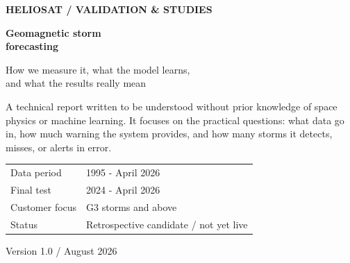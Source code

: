 \documentclass[10pt,a4paper]{article}
\begin{document}
\hypersetup{pageanchor=false}
\begin{titlepage}
\color{white}
\vspace*{12mm}
{\small\bfseries\color{Cyan}HELIOSAT / VALIDATION \& STUDIES}\par
\vspace{32mm}
{\fontsize{30}{34}\selectfont\bfseries Geomagnetic storm\\forecasting}\par
\vspace{7mm}
{\Large\color{white!78}How we measure it, what the model learns,\\and what the results really mean}\par
\vspace{14mm}
\colorbox{Navy!75!white}{\parbox{0.72\textwidth}{\color{white}\small\vspace{2mm}A technical report written to be understood without prior knowledge of space physics or machine learning. It focuses on the practical questions: what data go in, how much warning the system provides, and how many storms it detects, misses, or alerts in error.\vspace{2mm}}}
\vfill
\begin{tabular}{@{}ll@{}}
\color{white!55}\small Data period & \color{white}\small 1995 - April 2026\\
\color{white!55}\small Final test & \color{white}\small 2024 - April 2026\\
\color{white!55}\small Customer focus & \color{white}\small G3 storms and above\\
\color{white!55}\small Status & \color{white}\small Retrospective candidate / not yet live\\
\end{tabular}
\vspace{11mm}
{\footnotesize\color{white!50}Version 1.0 / August 2026}
\end{titlepage}
\hypersetup{pageanchor=true}
\end{document}
